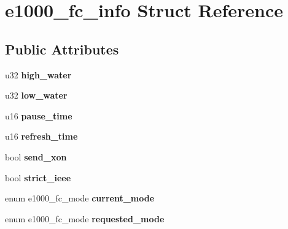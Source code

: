 \hypertarget{structe1000__fc__info}{
\section{e1000\_\-fc\_\-info Struct Reference}
\label{structe1000__fc__info}
}
\subsection*{Public Attributes}
\begin{DoxyCompactItemize}
\item 
\hypertarget{structe1000__fc__info_a82ca3d804abfe41250efd8bc34cbde5b}{
u32 {\bfseries high\_\-water}}
\label{structe1000__fc__info_a82ca3d804abfe41250efd8bc34cbde5b}

\item 
\hypertarget{structe1000__fc__info_a5e3471b53ec15bab723b2bbec60df384}{
u32 {\bfseries low\_\-water}}
\label{structe1000__fc__info_a5e3471b53ec15bab723b2bbec60df384}

\item 
\hypertarget{structe1000__fc__info_a7e9b4a330bfb246d472e6e3ccb4a9800}{
u16 {\bfseries pause\_\-time}}
\label{structe1000__fc__info_a7e9b4a330bfb246d472e6e3ccb4a9800}

\item 
\hypertarget{structe1000__fc__info_a8d49196c2f8e51ef6fa89c30a2a091cc}{
u16 {\bfseries refresh\_\-time}}
\label{structe1000__fc__info_a8d49196c2f8e51ef6fa89c30a2a091cc}

\item 
\hypertarget{structe1000__fc__info_acc5aec6640f7bda17f4bc7fd1ed63d51}{
bool {\bfseries send\_\-xon}}
\label{structe1000__fc__info_acc5aec6640f7bda17f4bc7fd1ed63d51}

\item 
\hypertarget{structe1000__fc__info_a28e6f8dfc7964a437cafa68cdbb575a4}{
bool {\bfseries strict\_\-ieee}}
\label{structe1000__fc__info_a28e6f8dfc7964a437cafa68cdbb575a4}

\item 
\hypertarget{structe1000__fc__info_a3b6c94ace03fbe0bc6ffb3817b6f3e09}{
enum e1000\_\-fc\_\-mode {\bfseries current\_\-mode}}
\label{structe1000__fc__info_a3b6c94ace03fbe0bc6ffb3817b6f3e09}

\item 
\hypertarget{structe1000__fc__info_aa635b23ea4246008fbd10258f12d9b0f}{
enum e1000\_\-fc\_\-mode {\bfseries requested\_\-mode}}
\label{structe1000__fc__info_aa635b23ea4246008fbd10258f12d9b0f}

\end{DoxyCompactItemize}


